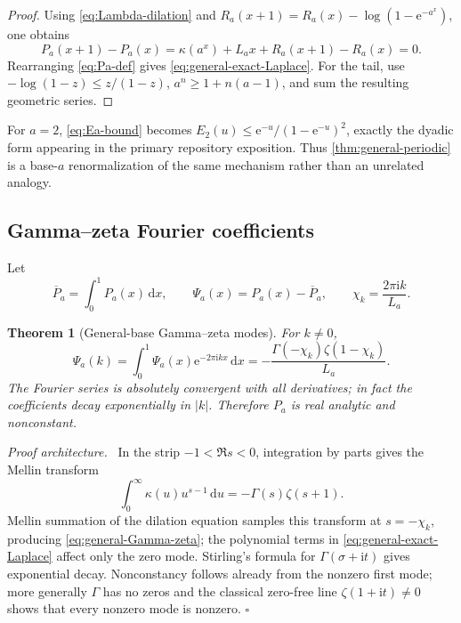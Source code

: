 \documentclass[11pt,oneside]{article}
\newtheorem{theorem}{Theorem}[section]
\theoremstyle{definition}
\theoremstyle{remark}
\newcommand{\e}{\mathrm e}
\newcommand{\ii}{\mathrm i}
\newcommand{\dd}{\,\mathrm d}
\newenvironment{proofidea}{\par\smallskip\noindent\textit{Proof architecture.}\ }{\hfill$\square$\par\smallskip}
\begin{document}
\begin{proof}
Using \eqref{eq:Lambda-dilation} and
$R_a(x+1)=R_a(x)-\log(1-\e^{-a^x})$, one obtains
\[
 P_a(x+1)-P_a(x)
 =\kappa(a^x)+L_ax+R_a(x+1)-R_a(x)=0.
\]
Rearranging \eqref{eq:Pa-def} gives \eqref{eq:general-exact-Laplace}.  For the tail, use
$-\log(1-z)\le z/(1-z)$, $a^n\ge1+n(a-1)$, and sum the resulting geometric series.
\end{proof}

For $a=2$, \eqref{eq:Ea-bound} becomes
$E_2(u)\le\e^{-u}/(1-\e^{-u})^2$, exactly the dyadic form appearing in the primary
repository exposition.  Thus \cref{thm:general-periodic} is a base-$a$ renormalization of the
same mechanism rather than an unrelated analogy.

\subsection{Gamma--zeta Fourier coefficients}

Let
\begin{equation}
 \overline P_a=\int_0^1P_a(x)\dd x,
 \qquad \Psi_a(x)=P_a(x)-\overline P_a,
 \qquad
 \chi_k=\frac{2\pi\ii k}{L_a}.
 \label{eq:Psi-a}
\end{equation}

\begin{theorem}[General-base Gamma--zeta modes]
\label{thm:general-Fourier-modes}
For $k\ne0$,
\begin{equation}
 \boxed{\quad
 \widehat\Psi_a(k)=\int_0^1\Psi_a(x)\e^{-2\pi\ii kx}\dd x
 =-\frac{\Gamma(-\chi_k)\zeta(1-\chi_k)}{L_a}.
 \quad}
 \label{eq:general-Gamma-zeta}
\end{equation}
The Fourier series is absolutely convergent with all derivatives; in fact the coefficients
decay exponentially in $|k|$.  Therefore $P_a$ is real analytic and nonconstant.
\end{theorem}

\begin{proofidea}
In the strip $-1<\Re s<0$, integration by parts gives the Mellin transform
\begin{equation}
 \int_0^\infty\kappa(u)u^{s-1}\dd u
 =-\Gamma(s)\zeta(s+1).
 \label{eq:Mellin-kappa}
\end{equation}
Mellin summation of the dilation equation samples this transform at
$s=-\chi_k$, producing \eqref{eq:general-Gamma-zeta}; the polynomial terms in
\eqref{eq:general-exact-Laplace} affect only the zero mode.  Stirling's formula for
$\Gamma(\sigma+\ii t)$ gives exponential decay.  Nonconstancy follows already from the
nonzero first mode; more generally $\Gamma$ has no zeros and the classical zero-free line
$\zeta(1+\ii t)\ne0$ shows that every nonzero mode is nonzero.
\end{proofidea}
\end{document}
